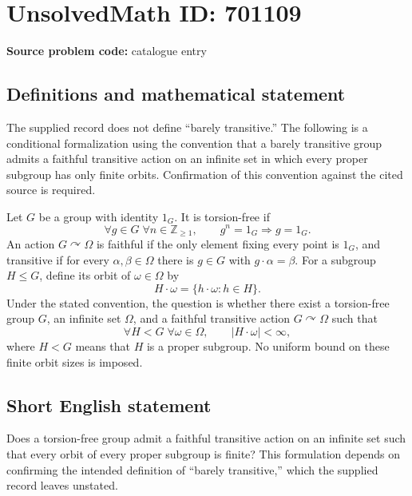 \documentclass[11pt]{article}
\newcommand{\Z}{\mathbb{Z}}
\begin{document}
\section*{UnsolvedMath ID: 701109}
\textbf{Source problem code:} catalogue entry
\subsection{Definitions and mathematical statement}
The supplied record does not define ``barely transitive.'' The following is a conditional formalization using the convention that a barely transitive group admits a faithful transitive action on an infinite set in which every proper subgroup has only finite orbits. Confirmation of this convention against the cited source is required.

Let \(G\) be a group with identity \(1_G\). It is torsion-free if
\[
\forall g\in G\;\forall n\in\Z_{\geq 1},\qquad g^n=1_G\Longrightarrow g=1_G.
\]
An action \(G\curvearrowright\Omega\) is faithful if the only element fixing every point is \(1_G\), and transitive if for every \(\alpha,\beta\in\Omega\) there is \(g\in G\) with \(g\cdot\alpha=\beta\). For a subgroup \(H\leq G\), define its orbit of \(\omega\in\Omega\) by
\[
H\cdot\omega=\{h\cdot\omega:h\in H\}.
\]
Under the stated convention, the question is whether there exist a torsion-free group \(G\), an infinite set \(\Omega\), and a faithful transitive action \(G\curvearrowright\Omega\) such that
\[
\forall H<G\;\forall\omega\in\Omega,\qquad |H\cdot\omega|<\infty,
\]
where \(H<G\) means that \(H\) is a proper subgroup. No uniform bound on these finite orbit sizes is imposed.
\subsection{Short English statement}
Does a torsion-free group admit a faithful transitive action on an infinite set such that every orbit of every proper subgroup is finite? This formulation depends on confirming the intended definition of ``barely transitive,'' which the supplied record leaves unstated.
\end{document}
